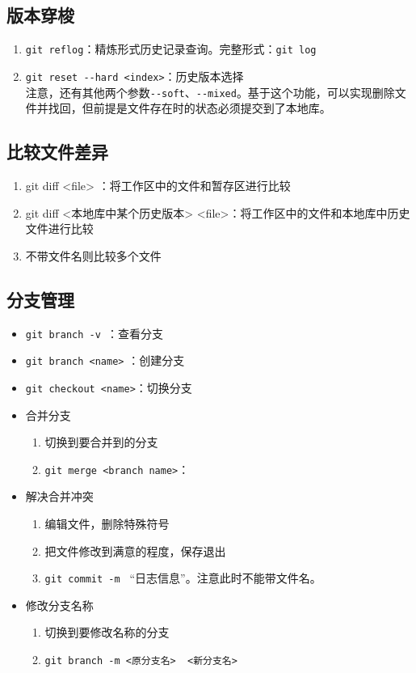 \subsection{版本穿梭}
\begin{enumerate}
\item \verb|git reflog|：精炼形式历史记录查询。完整形式：\verb|git log| 

\item \verb|git reset --hard <index>|：历史版本选择\\
注意，还有其他两个参数\verb|--soft|、\verb|--mixed|。基于这个功能，可以实现删除文件并找回，但前提是文件存在时的状态必须提交到了本地库。
\end{enumerate}



\subsection{比较文件差异}
\begin{enumerate}
\item git diff <file> ：将工作区中的文件和暂存区进行比较
\item git diff <本地库中某个历史版本> <file>：将工作区中的文件和本地库中历史文件进行比较
\item 不带文件名则比较多个文件
\end{enumerate}



\subsection{分支管理}
\begin{itemize}
\item \verb|git branch -v |：查看分支
\item \verb|git branch <name>| ：创建分支
\item \verb|git checkout <name>|：切换分支
\item 合并分支
\begin{enumerate}
\item 切换到要合并到的分支
\item \verb|git merge <branch name>|：
\end{enumerate}
\item 解决合并冲突
\begin{enumerate}
\item  编辑文件，删除特殊符号
\item 把文件修改到满意的程度，保存退出
\item \verb|git commit -m | ``日志信息''。注意此时不能带文件名。
\end{enumerate}

\item 修改分支名称
\begin{enumerate}
\item 切换到要修改名称的分支
\item \verb|git branch -m <原分支名>  <新分支名>|
\end{enumerate}
\end{itemize}



